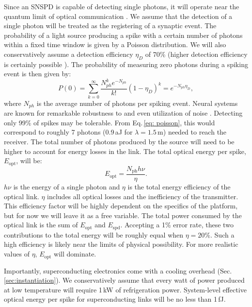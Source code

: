 \documentclass[twocolumn]{article}
\begin{document}
Since an SNSPD is capable of detecting single photons, it will operate near the quantum limit of optical communication \cite{razavi2012design}. We assume that the detection of a single photon will be treated as the registering of a synaptic event. The probability of a light source producing a spike with a certain number of photons within a fixed time window is given by a Poisson distribution. We will also conservatively assume a detection efficiency $\eta_D$ of 70\% (higher detection efficiency is certainly possible \cite{mave2013,rene2020}). The probability of measuring zero photons during a spiking event is then given by:
\begin{equation}
    P(0) = \sum_{k=0}^{\infty} \frac{N_{ph}^k e^{-N_{ph}}}{k!}(1-\eta_D)^{k} = e^{-N_{ph}\eta_D},
\label{eq: poisson}
\end{equation}
where $N_{ph}$ is the average number of photons per spiking event. Neural systems are known for remarkable robustness to and even utilization of noise \cite{stein2005neuronal, mcdonnell2011benefits}. Detecting only 99\% of spikes may be tolerable. From Eq.\,\ref{eq: poisson}, this would correspond to roughly 7 photons (0.9\,aJ for $\lambda = 1.5$\,\textmu m) needed to reach the receiver. The total number of photons produced by the source will need to be higher to account for energy losses in the link. The total optical energy per spike, $E_{\mathrm{opt}}$, will be:
\begin{equation}
    E_{\mathrm{opt}} = \frac{N_{\mathrm{ph}} h \nu}{\eta}.
\end{equation}
$h\nu$ is the energy of a single photon and $\eta$ is the total energy efficiency of the optical link. $\eta$ includes all optical losses and the inefficiency of the transmitter. This efficiency factor will be highly dependent on the specifics of the platform, but for now we will leave it as a free variable. The total power consumed by the optical link is the sum of $E_{\mathrm{opt}}$ and $E_{\mathrm{spd}}$. Accepting a 1\% error rate, these two contributions to the total energy will be roughly equal when $\eta = 20\%$. Such a high efficiency is likely near the limits of physical possibility. For more realistic values of $\eta$, $E_{\mathrm{opt}}$ will dominate.

Importantly, superconducting electronics come with a cooling overhead (Sec.\,\ref{sec:instantiation}). We conservatively assume that every watt of power produced at low temperature will require 1\,kW of refrigeration power. System-level effective optical energy per spike for superconducting links will be no less than 1\,fJ.
\end{document}
